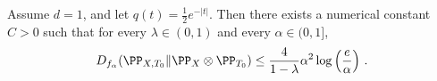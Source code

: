 \begin{theorem}
    \label{theorem:laplace_log_factor}
    Assume $d=1$, and let $q(t)=\frac12 e^{-|t|}$.
    Then there exists a numerical constant $C>0$ such that for every
    $\lambda\in(0,1)$ and every $\alpha\in(0,1]$,
    \begin{align}
        D_{f_\alpha}(\PP_{X,T_0}\|\PP_X\otimes\PP_{T_0})
        \le
        \frac{4}{1-\lambda}
        \alpha^2 \log\left(\frac{e}{\alpha}\right)\,.
        \label{eq:laplace_log_factor_fa_upper}
    \end{align}
\end{theorem}
